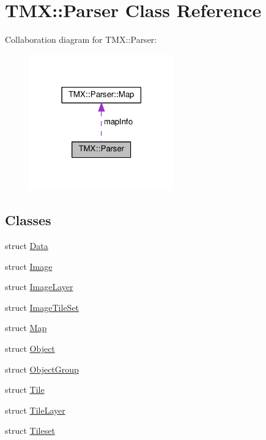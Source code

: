 \hypertarget{class_t_m_x_1_1_parser}{}\section{T\+MX\+:\+:Parser Class Reference}
\label{class_t_m_x_1_1_parser}


Collaboration diagram for T\+MX\+:\+:Parser\+:\nopagebreak
\begin{figure}[H]
\begin{center}
\leavevmode
\includegraphics[width=177pt]{class_t_m_x_1_1_parser__coll__graph}
\end{center}
\end{figure}
\subsection*{Classes}
\begin{DoxyCompactItemize}
\item 
struct \hyperlink{struct_t_m_x_1_1_parser_1_1_data}{Data}
\item 
struct \hyperlink{struct_t_m_x_1_1_parser_1_1_image}{Image}
\item 
struct \hyperlink{struct_t_m_x_1_1_parser_1_1_image_layer}{Image\+Layer}
\item 
struct \hyperlink{struct_t_m_x_1_1_parser_1_1_image_tile_set}{Image\+Tile\+Set}
\item 
struct \hyperlink{struct_t_m_x_1_1_parser_1_1_map}{Map}
\item 
struct \hyperlink{struct_t_m_x_1_1_parser_1_1_object}{Object}
\item 
struct \hyperlink{struct_t_m_x_1_1_parser_1_1_object_group}{Object\+Group}
\item 
struct \hyperlink{struct_t_m_x_1_1_parser_1_1_tile}{Tile}
\item 
struct \hyperlink{struct_t_m_x_1_1_parser_1_1_tile_layer}{Tile\+Layer}
\item 
struct \hyperlink{struct_t_m_x_1_1_parser_1_1_tileset}{Tileset}
\end{DoxyCompactItemize}
